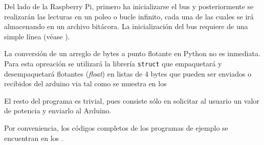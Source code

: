 

Del lado de la Raspberry Pi, primero ha inicializarse el bus \IIC y posteriormente se realizarán las lecturas en un poleo o bucle infinito, cada una de las cuales se irá almacenando en un archivo bitácora.
La inicialización del bus requiere de una simple línea (véase ).



La conversión de un arreglo de bytes a punto flotante en Python no es inmediata.
Para esta opreación se utilizará la librería \texttt{struct} que empaquetará y desempaquetará flotantes (\emph{float}) en listas de 4 bytes que pueden ser enviados o recibidos del arduino  via \IIC tal como se muestra en los 






El resto del programa es trivial, pues consiste sólo en solicitar al usuario un valor de potencia y enviarlo al Arduino.

Por conveniencia, los códigos completos de los programas de ejemplo se encuentran en los .
